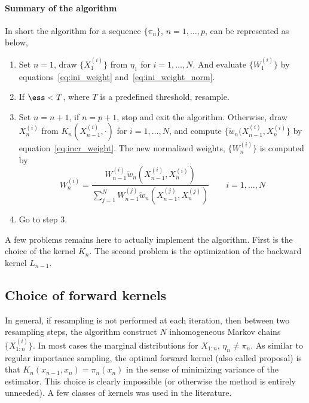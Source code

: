 \paragraph{Summary of the algorithm} In short the algorithm for a sequence
$\{\pi_n\}$, $n = 1,\dots,p$, can be represented as below,
\parencite{DelMoral2006}
\begin{enumerate}
  \item Set $n=1$, draw $\{X_1^{(i)}\}$ from $\eta_1$ for $i = 1,\dots,N$.
    And evaluate $\{W_1^{(i)}\}$ by equations~\eqref{eq:ini_weight}
    and~\eqref{eq:ini_weight_norm}.
  \item If $\text{\ess} < T$, where $T$ is a predefined threshold, resample.
  \item Set $n = n + 1$, if $n = p + 1$, stop and exit the algorithm.
    Otherwise, draw $X_n^{(i)}$ from $K_n(X_{n-1}^{(i)},\cdot)$ for $i =
    1,\dots,N$, and compute $\{\tilde{w}_n(X_{n-1}^{(i)}, X_n^{(i)}\}$ by
    equation~\eqref{eq:incr_weight}. The new normalized weights,
    $\{W_n^{(i)}\}$ is computed by
    \begin{equation}
      W_n^{(i)} = \frac{W_{n-1}^{(i)}\tilde{w}_n(X_{n-1}^{(i)},X_n^{(i)})}
      {\sum_{j=1}^NW_{n-1}^{(j)}\tilde{w}_n(X_{n-1}^{(j)},X_n^{(j)})}
      \qquad i = 1,\dots,N
    \end{equation}
  \item Go to step 3.
\end{enumerate}

A few problems remains here to actually implement the algorithm. First is
the choice of the kernel $K_n$.  The second problem is the optimization of
the backward kernel $L_{n-1}$.

\subsection{Choice of forward kernels}
\label{sub:Choice of forward kernels}

In general, if resampling is not performed at each iteration, then between two
resampling steps, the \smc algorithm construct $N$ inhomogeneous Markov chains
$\{X_{1:n}^{(i)}\}$. In most cases the marginal distributions for $X_{1:n}$,
$\eta_n \ne \pi_n$. As similar to regular importance sampling, the optimal
forward kernel (also called proposal) is that $K_n(x_{n-1},x_n) = \pi_n(x_n)$
in the sense of minimizing variance of the estimator. This choice is clearly
impossible (or otherwise the \smc method is entirely unneeded). A few classes
of kernels was used in the literature.

